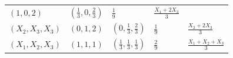 \documentclass[]{book}
\theoremstyle{definition}
\theoremstyle{definition}
\theoremstyle{definition}
\theoremstyle{remark}
\begin{document}
\begin{longtable}[]{@{}lllll@{}}
\begin{minipage}[t]{0.16\columnwidth}
\(\left( 1,0,2 \right)\)\strut
\end{minipage} & \begin{minipage}[t]{0.16\columnwidth}\raggedright\strut
\(\left( \frac{1}{3},0,\frac{2}{3} \right)\)\strut
\end{minipage} & \begin{minipage}[t]{0.17\columnwidth}\raggedright\strut
\(\frac{1}{9}\)\strut
\end{minipage} & \begin{minipage}[t]{0.18\columnwidth}\raggedright\strut
\(\frac{X_1+2X_3}{3}\)\strut
\end{minipage}\tabularnewline
\begin{minipage}[t]{0.18\columnwidth}\raggedright\strut
\(\left( X_2,X_3,X_3 \right)\)\strut
\end{minipage} & \begin{minipage}[t]{0.16\columnwidth}\raggedright\strut
\(\left( 0,1,2 \right)\)\strut
\end{minipage} & \begin{minipage}[t]{0.16\columnwidth}\raggedright\strut
\(\left( 0,\frac{1}{3},\frac{2}{3} \right)\)\strut
\end{minipage} & \begin{minipage}[t]{0.17\columnwidth}\raggedright\strut
\(\frac{1}{9}\)\strut
\end{minipage} & \begin{minipage}[t]{0.18\columnwidth}\raggedright\strut
\(\frac{X_2+2X_3}{3}\)\strut
\end{minipage}\tabularnewline
\begin{minipage}[t]{0.18\columnwidth}\raggedright\strut
\(\left( X_1,X_2,X_3 \right)\)\strut
\end{minipage} & \begin{minipage}[t]{0.16\columnwidth}\raggedright\strut
\(\left( 1,1,1 \right)\)\strut
\end{minipage} & \begin{minipage}[t]{0.16\columnwidth}\raggedright\strut
\(\left( \frac{1}{3},\frac{1}{3},\frac{1}{3} \right)\)\strut
\end{minipage} & \begin{minipage}[t]{0.17\columnwidth}\raggedright\strut
\(\frac{2}{9}\)\strut
\end{minipage} & \begin{minipage}[t]{0.18\columnwidth}\raggedright\strut
\(\frac{X_1+X_2+X_3}{3}\)\strut
\end{minipage}\tabularnewline
\bottomrule
\end{longtable}
\end{document}
